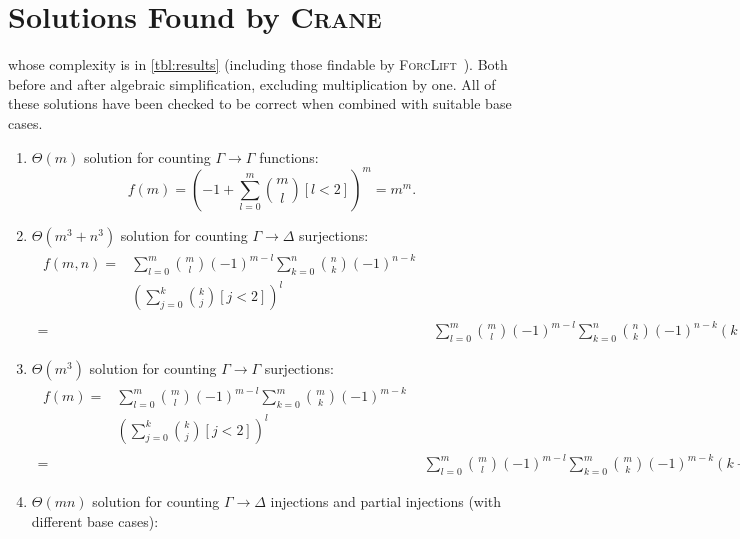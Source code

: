 \documentclass{article}
\theoremstyle{definition}
\begin{document}

\appendix
\section{Solutions Found by \textsc{Crane}}\label{app:solutions}


whose complexity is in \cref{tbl:results} (including those findable by
\textsc{ForcLift}~\cite{DBLP:conf/ijcai/BroeckTMDR11}). Both before and after
algebraic simplification, excluding multiplication by one. All of these
solutions have been checked to be correct when combined with suitable base
cases.

\begin{enumerate}
  \item $\Theta(m)$ solution for counting $\Gamma \to \Gamma$ functions:
  \[
    f(m) = {\left(-1 + \sum_{l=0}^{m} \binom{m}{l} [l < 2]\right)}^{m} = m^{m}.
  \]
  \item $\Theta(m^3 + n^3)$ solution for counting $\Gamma \to \Delta$
  surjections:
  \begin{align*}
    \begin{split}
      f(m, n) ={}& \sum_{l=0}^{m} \binom{m}{l}{(-1)}^{m-l} \sum_{k=0}^{n} \binom{n}{k} {(-1)}^{n-k}\\
                 &{\left( \sum_{j=0}^{k} \binom{k}{j} [j < 2] \right)}^{l}
    \end{split}\\
    ={}& \sum_{l=0}^{m} \binom{m}{l}{(-1)}^{m-l} \sum_{k=0}^{n} \binom{n}{k} {(-1)}^{n-k} {(k+1)}^{l}.
  \end{align*}
  \item $\Theta(m^{3})$ solution for counting $\Gamma \to \Gamma$ surjections:
  \begin{align*}
    \begin{split}
      f(m) ={}& \sum_{l=0}^{m} \binom{m}{l}{(-1)}^{m-l} \sum_{k=0}^{m} \binom{m}{k} {(-1)}^{m-k}\\
              &{\left( \sum_{j=0}^{k} \binom{k}{j} [j < 2] \right)}^{l}
    \end{split}\\
    ={}& \sum_{l=0}^{m} \binom{m}{l}{(-1)}^{m-l} \sum_{k=0}^{m} \binom{m}{k} {(-1)}^{m-k} {(k+1)}^{l}.
  \end{align*}
  \item $\Theta(mn)$ solution for counting $\Gamma \to \Delta$ injections and
  partial injections (with different base cases):

\end{enumerate}
\end{document}
